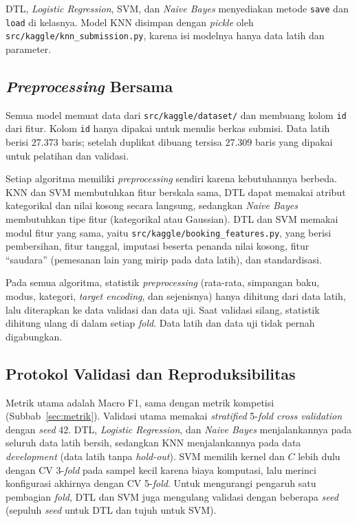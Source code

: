 DTL, \textit{Logistic Regression}, SVM, dan \textit{Naive Bayes} menyediakan metode \texttt{save} dan
\texttt{load} di kelasnya. Model KNN disimpan dengan \textit{pickle} oleh
\nolinkurl{src/kaggle/knn_submission.py}, karena isi modelnya hanya data latih dan parameter.

\subsection{\textit{Preprocessing} Bersama}

Semua model memuat data dari \nolinkurl{src/kaggle/dataset/} dan membuang kolom \texttt{id} dari
fitur. Kolom \texttt{id} hanya dipakai untuk menulis berkas submisi. Data latih berisi 27.373 baris;
setelah duplikat dibuang tersisa 27.309 baris yang dipakai untuk pelatihan dan validasi.

Setiap algoritma memiliki \textit{preprocessing} sendiri karena kebutuhannya berbeda. KNN dan SVM
membutuhkan fitur berskala sama, DTL dapat memakai atribut kategorikal dan nilai kosong secara
langsung, sedangkan \textit{Naive Bayes} membutuhkan tipe fitur (kategorikal atau Gaussian). DTL dan
SVM memakai modul fitur yang sama, yaitu \nolinkurl{src/kaggle/booking_features.py}, yang berisi
pembersihan, fitur tanggal, imputasi beserta penanda nilai kosong, fitur ``saudara'' (pemesanan lain
yang mirip pada data latih), dan standardisasi.

Pada semua algoritma, statistik \textit{preprocessing} (rata-rata, simpangan baku, modus, kategori,
\textit{target encoding}, dan sejenisnya) hanya dihitung dari data latih, lalu diterapkan ke data
validasi dan data uji. Saat validasi silang, statistik dihitung ulang di dalam setiap \textit{fold}.
Data latih dan data uji tidak pernah digabungkan.

\subsection{Protokol Validasi dan Reproduksibilitas}

Metrik utama adalah Macro F1, sama dengan metrik kompetisi (Subbab~\ref{sec:metrik}). Validasi utama
memakai \textit{stratified} 5-\textit{fold cross validation} dengan \textit{seed} 42. DTL,
\textit{Logistic Regression}, dan \textit{Naive Bayes} menjalankannya pada seluruh data latih bersih,
sedangkan KNN menjalankannya pada data \textit{development} (data latih tanpa \textit{hold-out}). SVM
memilih kernel dan $C$ lebih dulu dengan CV 3-\textit{fold} pada sampel kecil karena biaya komputasi,
lalu merinci konfigurasi akhirnya dengan CV 5-\textit{fold}. Untuk mengurangi pengaruh satu pembagian \textit{fold}, DTL dan SVM juga mengulang
validasi dengan beberapa \textit{seed} (sepuluh \textit{seed} untuk DTL dan tujuh untuk SVM).

